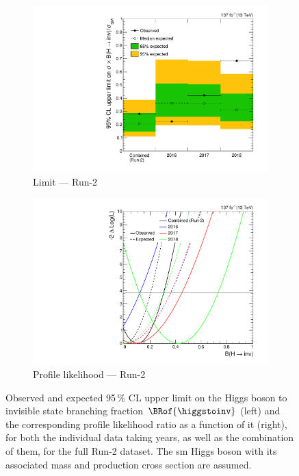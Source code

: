 \begin{figure}[htbp]
    \centering
    \begin{subfigure}[t]{0.45\textwidth}
        \includegraphics[width=\textwidth]{figures/limits/full_Run2/limit_Run2_comb_per_year.pdf}
        \caption{Limit --- Run-2}
    \end{subfigure}
    \hspace{0.05\textwidth}
    \begin{subfigure}[t]{0.45\textwidth}
        \includegraphics[width=\textwidth]{figures/likelihood_scan/profile_likelihood_scan_Run2_per_year.pdf}
        \caption{Profile likelihood --- Run-2}
    \end{subfigure}
    \caption[Observed and expected 95\,\% CL upper limit on the Higgs boson to invisible state branching fraction $\BRof{\higgstoinv}$ and the corresponding profile likelihood ratio as a function of it, for both the individual data taking years, as well as the combination of them, for the full Run-2 dataset]{Observed and expected 95\,\% CL upper limit on the Higgs boson to invisible state branching fraction $\BRof{\higgstoinv}$ (left) and the corresponding profile likelihood ratio as a function of it (right), for both the individual data taking years, as well as the combination of them, for the full Run-2 dataset. The \acrlong{sm} Higgs boson with its associated mass and production cross section are assumed.}
    \label{fig:htoinv_limit_likelihood_Run2_per_year}
\end{figure}

